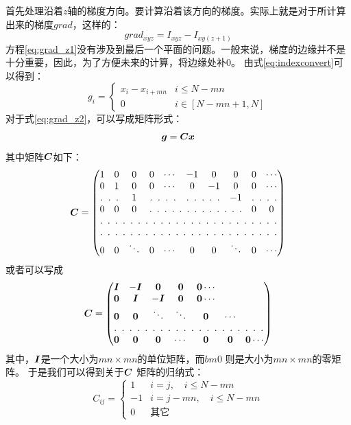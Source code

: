 首先处理沿着$z$轴的梯度方向。要计算沿着该方向的梯度。实际上就是对于所计算出来的梯度$grad$，这样的：
\begin{equation}\label{eq:grad_z1}
grad_{xyz} = I_{xyz}-I_{xy(z+1)}
\end{equation}
方程\eqref{eq:grad_z1}没有涉及到最后一个平面的问题。一般来说，梯度的边缘并不是十分重要，因此，为了方便未来的计算，将边缘处补$0$。
由式\eqref{eq:indexconvert}可以得到：
\begin{equation}\label{eq:grad_z2}
g_i = \begin{cases}
        x_{i} - x_{i+mn} & i \le N-mn \\
        0   & i \in [N-mn+1,N]
        \end{cases}
\end{equation}
对于式\eqref{eq:grad_z2}，可以写成矩阵形式：
\begin{equation*}
\bm{g} = \bm{C} \bm{ x}
\end{equation*}
其中矩阵$\bm{C}$如下：
\begin{equation*}
\C = \begin{pmatrix}
1 & 0 & 0 & 0 & \cdots &-1 & 0 &0 &0 &\cdots \\
0 & 1 & 0 & 0 &\cdots &0 & -1 &0 &0 &\cdots \\
\hdotsfor[3]{2}& 1& \hdotsfor[3]{2} &\hdotsfor[3]{2}&-1&\hdotsfor[3]{2} \\
0 & 0 & 0 & \hdotsfor[3]{5}&0&0 \\
\hdotsfor[3]{10}\\
\hdotsfor[3]{10}\\
0 & 0 & \ddots & 0 & \cdots & 0 & 0 & \ddots & 0& \cdots
\end{pmatrix}
\end{equation*}
或者可以写成
\begin{equation*}
\C = \begin{pmatrix}
\bI &  -\bI & \0 & \0 & \0 \cdots \\
\0 & \bI &  -\bI & \0 & \0 \cdots \\
\0 & \0  & \ddots & \ddots & \0 & \cdots \\
\hdotsfor[3]{7} \\
\0 & \0 & \0 &\cdots & \0 & \0 &\0 \cdots
\end{pmatrix}
\end{equation*}
其中，$\bm{I}$是一个大小为$mn \times mn$的单位矩阵，而$bm 0$ 则是大小为$mn \times mn$的零矩阵。
于是我们可以得到关于$\bm{C}$ 矩阵的归纳式：
\begin{equation}\label{eq:C}
C_{ij} = \begin{cases}
1 & i = j,\quad i\le N-mn \\
-1 & i = j- mn,\quad i\le N- mn \\
0 & \text{其它}
\end{cases}
\end{equation}

